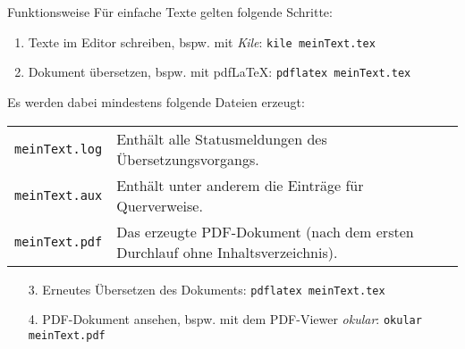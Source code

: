 \begin{frame}{Funktionsweise}
Für einfache Texte gelten folgende Schritte:
\begin{enumerate}
	\item Texte im Editor schreiben, bspw. mit \textit{Kile}: \texttt{kile meinText.tex}
	\item Dokument übersetzen, bspw. mit pdf\LaTeX{}: \texttt{pdflatex meinText.tex}
\end{enumerate}
Es werden dabei mindestens folgende Dateien erzeugt: \\
\begin{tabular}[pos]{lp{8.5cm}}
	\texttt{meinText.log} & Enthält alle Statusmeldungen des Übersetzungsvorgangs. \\
	\texttt{meinText.aux} & Enthält unter anderem die Einträge für Querverweise. \\
	\texttt{meinText.pdf} & Das erzeugte PDF-Dokument (nach dem ersten Durchlauf ohne Inhaltsverzeichnis).
\end{tabular}
\begin{enumerate}
	\item[3.] Erneutes Übersetzen des Dokuments: \texttt{pdflatex meinText.tex}
	\item[4.] PDF-Dokument ansehen, bspw. mit dem PDF-Viewer \textit{okular}: \texttt{okular meinText.pdf}
\end{enumerate}
\end{frame}
